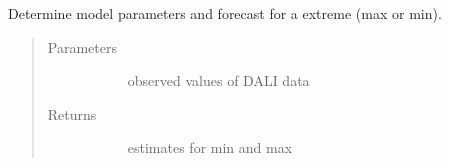 \documentclass[letterpaper,10pt,english]{sphinxmanual}
\begin{document}
\begin{fulllineitems}
\label{\detokenize{autoapi/src/forecast/forecast/index:src.forecast.forecast.determine_estimates_minmax}}
Determine model parameters and forecast for a extreme (max or min).
\begin{quote}\begin{description}
\item[{Parameters}] \leavevmode\begin{description}
\item[{}] \leavevmode{[}\sphinxcode{\sphinxupquote{pd.DataFrame}}{]}
observed values of DALI data

\end{description}

\item[{Returns}] \leavevmode\begin{description}
\item[{}] \leavevmode
estimates for min and max

\end{description}

\end{description}\end{quote}

\end{fulllineitems}

\end{document}

